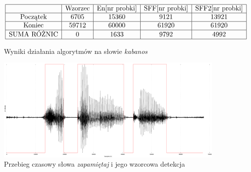 \documentclass[eng,printmode]{mgr}
\begin{document}
	
	\begin{figure}
	 	\begin{center}
	 		$\begin{array}{ | c | c | c | c | c | }
	 			\hline
	 			& \textrm{Wzorzec}&\textrm{En[nr probki]} & \textrm{SFF[nr probki]} & \textrm{SFF2[nr probki]} \\ \hline
	 			\textrm{Początek} & 6705 & 15360 & 9121 & 13921  \\ \hline
	 			\textrm{Koniec} & 59712 & 60000 & 61920 & 61920  \\ \hline
	 			\textrm{SUMA RÓŻNIC} & 0 & 1633 & 9792 & 4992    \\ \hline
	 		\end{array}$
	 		\caption{Wyniki działania algorytmów na słowie \emph{kabanos}}\vspace{5mm}
	 	\end{center}
	 	
	 	\begin{center}
	 		\includegraphics[scale=0.2]{zapamietaj.png}
	 		\caption{Przebieg czasowy słowa \emph{zapamiętaj} i jego wzorcowa detekcja}\vspace{5mm}
	 	\end{center}
	\end{figure}
 
\end{document}
